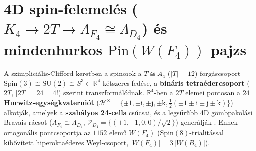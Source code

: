\documentclass[11pt,a4paper]{article}
\begin{document}
\section{4D spin-felemelés (\texorpdfstring{$K_4 \to 2T \to \Lambda_{F_4} \cong \Lambda_{D_4}$}{K4 -> 2T -> F4}) és mindenhurkos \texorpdfstring{$\mathrm{Pin}(W(F_4))$}{Pin(W(F4))} pajzs}
\label{sec:24cell}

A szimpliciális-Clifford keretben a spinorok a $T \cong A_4$ ($|T|=12$) forgáscsoport $\mathrm{Spin}(3) \cong \mathrm{SU}(2) \cong S^3 \subset \mathbb{R}^4$ kétszeres fedése, a \textbf{bináris tetraédercsoport} ($2T$, $|2T| = 24 = 4!$) szerint transzformálódnak. $\mathbb{R}^4$-ben a $2T$ elemei pontosan a $24$ \textbf{Hurwitz-egységkvaterniót} ($\mathcal{H}^\times = \{\pm 1, \pm\mathrm{i}, \pm\mathrm{j}, \pm\mathrm{k}, \frac{1}{2}(\pm 1 \pm \mathrm{i} \pm \mathrm{j} \pm \mathrm{k})\}$) alkotják, amelyek a \textbf{szabályos 24-cella} csúcsai, és a legsűrűbb 4D gömbpakolási Bravais-rácsot ($\Lambda_{F_4} \cong \Lambda_{D_4}$, $\mathcal{V}_{D_4} = \{(\pm 1, \pm 1, 0, 0)/\sqrt{2}\}$) generálják \cite{Celmaster1982,BhanotBitarHellerNeuberger1990,BhanotBitarHellerNeuberger1991}. Ennek ortogonális pontcsoportja az $1152$ elemű $W(F_4)$ ($\mathrm{Spin}(8)$-trialitással kibővített hiperoktaéderes Weyl-csoport, $|W(F_4)| = 3\,|W(B_4)|$).
\end{document}
